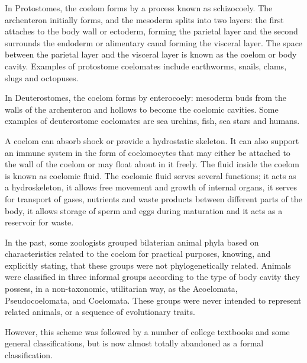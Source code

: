 In Protostomes, the coelom forms by a process known as schizocoely. The
archenteron initially forms, and the mesoderm splits into two layers:
the first attaches to the body wall or ectoderm, forming the parietal
layer and the second surrounds the endoderm or alimentary canal forming
the visceral layer. The space between the parietal layer and the
visceral layer is known as the coelom or body cavity. Examples of
protostome coelomates include earthworms, snails, clams, slugs and
octopuses.

In Deuterostomes, the coelom forms by enterocoely: mesoderm buds from
the walls of the archenteron and hollows to become the coelomic
cavities. Some examples of deuterostome coelomates are sea urchins,
fish, sea stars and humans.

A coelom can absorb shock or provide a hydrostatic skeleton. It can also
support an immune system in the form of coelomocytes that may either be
attached to the wall of the coelom or may float about in it freely. The
fluid inside the coelom is known as coelomic fluid. The coelomic fluid
serves several functions; it acts as a hydroskeleton, it allows free
movement and growth of internal organs, it serves for transport of
gases, nutrients and waste products between different parts of the body,
it allows storage of sperm and eggs during maturation and it acts as a
reservoir for waste.

In the past, some zoologists grouped bilaterian animal phyla based on
characteristics related to the coelom for practical purposes, knowing,
and explicitly stating, that these groups were not phylogenetically
related. Animals were classified in three informal groups according to
the type of body cavity they possess, in a non-taxonomic, utilitarian
way, as the Acoelomata, Pseudocoelomata, and Coelomata. These groups
were never intended to represent related animals, or a sequence of
evolutionary traits.

However, this scheme was followed by a number of college textbooks and
some general classifications, but is now almost totally abandoned as a
formal classification.

